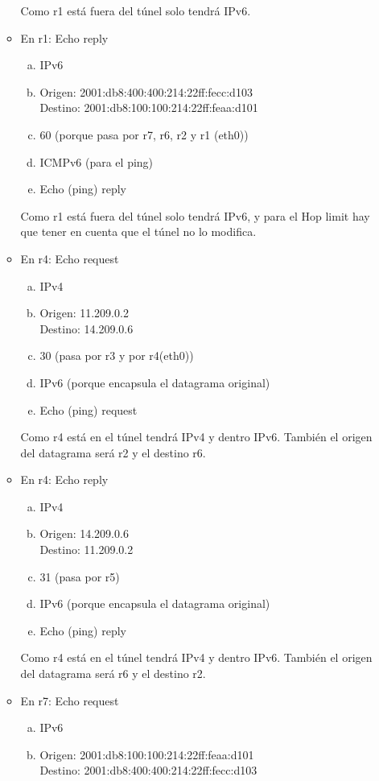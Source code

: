 \documentclass[12pt, a4paper]{report}
\begin{document}
\begin{enumerate}
\begin{itemize}
		Como r1 está fuera del túnel solo tendrá IPv6.
		\item En r1: Echo reply
		\begin{enumerate}[a)]
			\item IPv6
			\item Origen: 2001:db8:400:400:214:22ff:fecc:d103\\
			Destino: 2001:db8:100:100:214:22ff:feaa:d101
			\item 60 (porque pasa por r7, r6, r2 y r1 (eth0))
			\item ICMPv6 (para el ping)
			\item Echo (ping) reply
		\end{enumerate}
		Como r1 está fuera del túnel solo tendrá IPv6, y para el Hop limit hay que tener en cuenta que el túnel no lo modifica.
		\item En r4: Echo request
		\begin{enumerate}[a)]
			\item IPv4
			\item Origen: 11.209.0.2\\
			Destino: 14.209.0.6
			\item 30 (pasa por r3 y por r4(eth0))
			\item IPv6 (porque encapsula el datagrama original)
			\item Echo (ping) request
		\end{enumerate}
		Como r4 está en el túnel tendrá IPv4 y dentro IPv6. También el origen del datagrama será r2 y el destino r6.
		\item En r4: Echo reply
		\begin{enumerate}[a)]
			\item IPv4
			\item Origen: 14.209.0.6\\
			Destino: 11.209.0.2
			\item 31 (pasa por r5)
			\item IPv6 (porque encapsula el datagrama original)
			\item Echo (ping) reply
		\end{enumerate}
		Como r4 está en el túnel tendrá IPv4 y dentro IPv6. También el origen del datagrama será r6 y el destino r2.
		\item En r7: Echo request
		\begin{enumerate}[a)]
			\item IPv6
			\item Origen: 2001:db8:100:100:214:22ff:feaa:d101\\
			Destino: 2001:db8:400:400:214:22ff:fecc:d103

\end{enumerate}
\end{itemize}
\end{enumerate}
\end{document}
